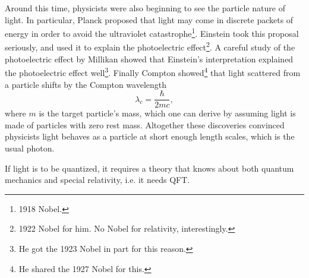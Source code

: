 Around this time, physicists were also beginning to see the particle nature of
light. In particular, Planck proposed that light may come in discrete packets of
energy in order to avoid the ultraviolet 
catastrophe\footnote{1918 Nobel.}.
Einstein took this proposal seriously, and used it to explain the photoelectric
effect\footnote{1922 Nobel for him. No Nobel for relativity, interestingly.}. 
A careful study of the photoelectric effect by Millikan showed that
Einstein's interpretation explained the photoelectric effect well\footnote{He
got the 1923 Nobel in part for this reason.}. Finally
Compton showed\footnote{He shared the 1927 Nobel for this.} 
that light scattered from a particle shifts by the Compton
wavelength
\begin{equation}
  \lambda_c=\frac{\hbar}{2mc},
\end{equation}
where $m$ is the target particle's mass, which one can derive by assuming light
is made of particles with zero rest mass.
Altogether these discoveries convinced physicists light behaves as a particle
at short enough length scales, which is the usual photon.


If light is to be quantized, it requires a theory that knows about both quantum
mechanics and special relativity, i.e. it needs QFT. 




